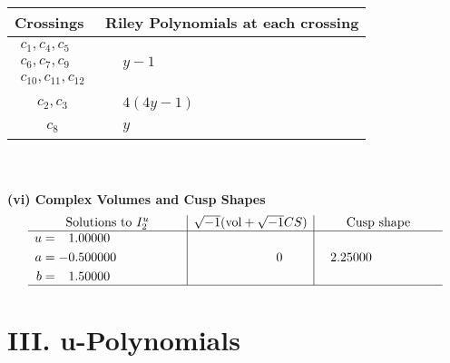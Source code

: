 \documentclass[1p]{elsarticle_modified}
\theoremstyle{definition}
\newcommand{\I}{\sqrt{-1}}
\begin{document}
\begin{tabular}{m{50pt}|m{274pt}}
Crossings & \hspace{64pt}Riley Polynomials at each crossing \\
\hline $$\begin{aligned}c_{1},c_{4},c_{5}\\c_{6},c_{7},c_{9}\\c_{10},c_{11},c_{12}\end{aligned}$$&$\begin{aligned}
&y-1
\end{aligned}$\\
\hline $$\begin{aligned}c_{2},c_{3}\end{aligned}$$&$\begin{aligned}
&4(4 y-1)
\end{aligned}$\\
\hline $$\begin{aligned}c_{8}\end{aligned}$$&$\begin{aligned}
&y
\end{aligned}$\\
\hline
\end{tabular}\\~\\
\newpage\flushleft \textbf{(vi) Complex Volumes and Cusp Shapes}
$$\begin{array}{c|c|c}  
\text{Solutions to }I^u_{2}& \I (\text{vol} + \sqrt{-1}CS) & \text{Cusp shape}\\
 \hline 
\begin{aligned}
u &= \phantom{-}1.00000\phantom{ +0.000000I} \\
a &= -0.500000\phantom{ +0.000000I} \\
b &= \phantom{-}1.50000\phantom{ +0.000000I}\end{aligned}
 & \phantom{-0.000000 } 0 & \phantom{-}2.25000\phantom{ +0.000000I}\\
 \hline 
 \end{array}$$\newpage
\newpage\renewcommand{\arraystretch}{1}
\centering \section*{ III. u-Polynomials}
\end{document}
